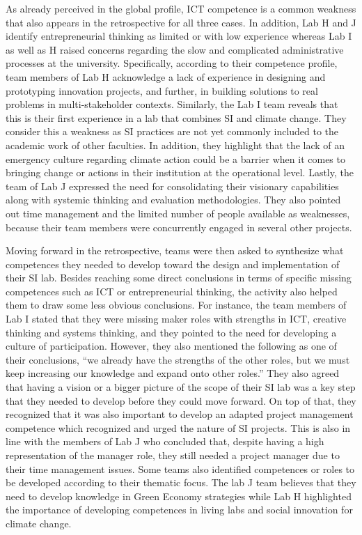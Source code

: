 \documentclass[AMA,STIX1COL,APA,STIX2COL]{WileyNJD-v2}
\begin{document}
As already perceived in the global profile, ICT competence is a common
weakness that also appears in the retrospective for all three cases. In
addition, Lab H and J identify entrepreneurial thinking as limited or
with low experience whereas Lab I as well as H raised concerns regarding
the slow and complicated administrative processes at the university.
Specifically, according to their competence profile, team members of Lab
H acknowledge a lack of experience in designing and prototyping
innovation projects, and further, in building solutions to real problems
in multi-stakeholder contexts. Similarly, the Lab I team reveals that
this is their first experience in a lab that combines SI and climate
change. They consider this a weakness as SI practices are not yet
commonly included to the academic work of other faculties. In addition,
they highlight that the lack of an emergency culture regarding climate
action could be a barrier when it comes to bringing change or actions in
their institution at the operational level. Lastly, the team of Lab J
expressed the need for consolidating their visionary capabilities along
with systemic thinking and evaluation methodologies. They also pointed
out time management and the limited number of people available as
weaknesses, because their team members were concurrently engaged in
several other projects.

Moving forward in the retrospective, teams were then asked to synthesize
what competences they needed to develop toward the design and
implementation of their SI lab. Besides reaching some direct conclusions
in terms of specific missing competences such as ICT or entrepreneurial
thinking, the activity also helped them to draw some less obvious
conclusions. For instance, the team members of Lab I stated that they
were missing maker roles with strengths in ICT, creative thinking and
systems thinking, and they pointed to the need for developing a culture
of participation. However, they also mentioned the following as one of
their conclusions, ``we already have the strengths of the other roles,
but we must keep increasing our knowledge and expand onto other roles.''
They also agreed that having a vision or a bigger picture of the scope
of their SI lab was a key step that they needed to develop before they
could move forward. On top of that, they recognized that it was also
important to develop an adapted project management competence which
recognized and urged the nature of SI projects. This is also in line
with the members of Lab J who concluded that, despite having a high
representation of the manager role, they still needed a project manager
due to their time management issues. Some teams also identified
competences or roles to be developed according to their thematic focus.
The lab J team believes that they need to develop knowledge in Green
Economy strategies while Lab H highlighted the importance of developing
competences in living labs and social innovation for climate change.
\end{document}
